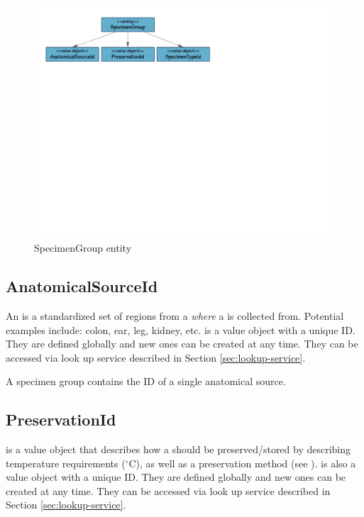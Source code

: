 \begin{figure}[h]
  \centering
  \includegraphics[trim={9mm 162mm 80mm 9mm}, clip,
    width=1\textwidth]{images/specimen-group}
  \caption{SpecimenGroup entity}
  \label{fig:specimen-group}
\end{figure}

\subsection*{AnatomicalSourceId}

An  is a standardized set of regions from a
 \emph{where} a  is collected
from. Potential examples include: colon, ear, leg, kidney,
etc.  is a value object with a unique ID. They are
defined globally and new ones can be created at any time. They can be accessed
via look up service described in Section \ref{sec:lookup-service}.

A specimen group contains the ID of a single anatomical source.

\subsection*{PreservationId}

 is a value object that describes how a
 should be preserved/stored by describing temperature
requirements ($^\circ$C), as well as a preservation method (see
).  is also a value
object with a unique ID. They are defined globally and new ones can be created
at any time. They can be accessed via look up service described in Section
\ref{sec:lookup-service}.

